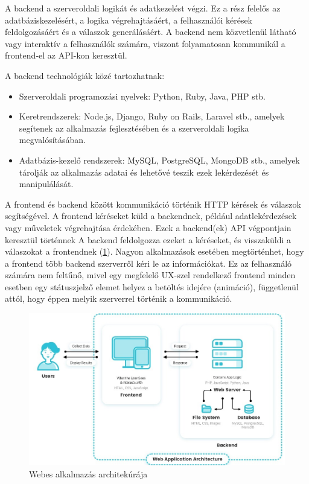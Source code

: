 A backend a szerveroldali logikát és adatkezelést végzi. Ez a rész felelős az adatbáziskezelésért, a logika végrehajtásáért, a felhasználói kérések feldolgozásáért és a válaszok generálásáért. A backend nem közvetlenül látható vagy interaktív a felhasználók számára, viszont folyamatosan kommunikál a frontend-el az API-kon keresztül.

A backend technológiák közé tartozhatnak:
\begin{itemize}
	\item Szerveroldali programozási nyelvek: Python, Ruby, Java, PHP stb.
	\item Keretrendszerek: Node.js, Django, Ruby on Rails, Laravel stb., amelyek segítenek az alkalmazás fejlesztésében és a szerveroldali logika megvalósításában.
	\item Adatbázis-kezelő rendszerek: MySQL, PostgreSQL, MongoDB stb., amelyek tárolják az alkalmazás adatai és lehetővé teszik ezek lekérdezését és manipulálását.
\end{itemize}

A frontend és backend között kommunikáció történik HTTP kérések és válaszok segítségével. A frontend kéréseket küld a backendnek, például adatlekérdezések vagy műveletek végrehajtása érdekében. Ezek a backend(ek) API végpontjain keresztül történnek A backend feldolgozza ezeket a kéréseket, és visszaküldi a válaszokat a frontendnek (\ref{abra:Architektura}). Nagyon alkalmazások esetében megtörténhet, hogy a frontend több backend szerverről kéri le az információkat. Ez az felhasználó számára nem feltűnő, mivel egy megfelelő UX-szel rendelkező frontend minden esetben egy státuszjelző elemet helyez a betöltés idejére (animáció), függetlenül attól, hogy éppen melyik szerverrel történik a kommunikáció.

\begin{figure}[!h]
	\centering
	\includegraphics[scale=0.2]{images/architektura}
	\caption{Webes alkalmazás architekúrája}
	\label{abra:Architektura}
\end{figure}

